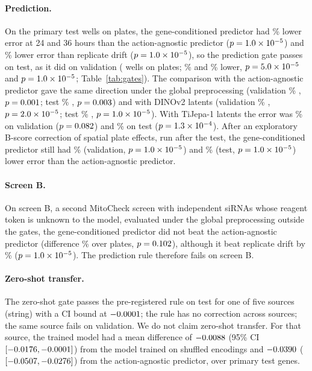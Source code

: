 \paragraph{Prediction.} On the \HOneTestWells{} primary test wells on \SignalTestPlates{} plates,
the gene-conditioned predictor had \SignalTestAg\% lower error at 24 and 36 hours than the
action-agnostic predictor ($p=1.0\times10^{-5}$) and \SignalTestDrift\% lower error than replicate
drift ($p=1.0\times10^{-5}$), so the prediction gate passes on test, as it did on validation
(\HOneValWells{} wells on \SignalValPlates{} plates; \SignalValAg\% and \SignalValDrift\% lower,
$p=5.0\times10^{-5}$ and $p=1.0\times10^{-5}$; Table~\ref{tab:gates}). The comparison with the
action-agnostic predictor gave the same direction under the global preprocessing (validation
\HOneValGlobalAg\% \HOneValGlobalAgDir, $p=0.001$; test \HOneTestGlobalAg\%
\HOneTestGlobalAgDir, $p=0.003$) and with DINOv2 latents (validation
\HOneValDinoAg\% \HOneValDinoAgDir, $p=2.0\times10^{-5}$; test \HOneTestDinoAg\%
\HOneTestDinoAgDir, $p=1.0\times10^{-5}$). With TiJepa-1 latents the error was
\HOneValTijepaAg\% \HOneValTijepaAgDir{} on validation ($p=0.082$) and
\HOneTestTijepaAg\% \HOneTestTijepaAgDir{} on test ($p=1.3\times10^{-4}$). After an
exploratory B-score correction of spatial plate effects, run after the test, the
gene-conditioned predictor still had \EOneValAg\% (validation, $p=1.0\times10^{-5}$) and
\EOneTestAg\% (test, $p=1.0\times10^{-5}$) lower error than the action-agnostic predictor.

\paragraph{Screen B.} On screen B, a second MitoCheck screen with independent siRNAs whose
reagent token is unknown to the model, evaluated under the global preprocessing outside the
gates, the gene-conditioned predictor did not beat the action-agnostic predictor (difference
\ScreenBAg\% over \ScreenBPlates{} plates, $p=0.102$), although it beat replicate drift by
\ScreenBDrift\% ($p=1.0\times10^{-5}$). The prediction rule therefore fails on screen B.

\paragraph{Zero-shot transfer.} The zero-shot gate passes the pre-registered rule on test for
one of five sources (string) with a CI bound at $-0.0001$; the rule has no
correction across sources; the same source fails on validation. We do not claim zero-shot
transfer. For that source, the trained model had a mean difference of
$-0.0088$ (95\% CI $[-0.0176, -0.0001]$)
from the model trained on shuffled encodings and $-0.0390$
($[-0.0507, -0.0276]$) from the action-agnostic predictor, over
\ZeroShotTestStringGenes{} primary test genes.

